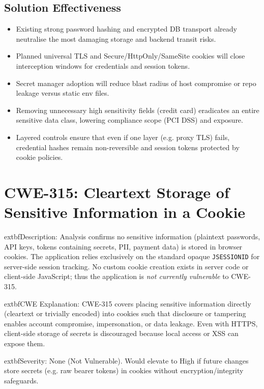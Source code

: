 \documentclass[]{UCD_CS_FYP_Report}
\begin{document}
\subsection*{Solution Effectiveness}
\begin{itemize}
	\item Existing strong password hashing and encrypted DB transport already neutralise the most damaging storage and backend transit risks.
	\item Planned universal TLS and Secure/HttpOnly/SameSite cookies will close interception windows for credentials and session tokens.
	\item Secret manager adoption will reduce blast radius of host compromise or repo leakage versus static env files.
	\item Removing unnecessary high sensitivity fields (credit card) eradicates an entire sensitive data class, lowering compliance scope (PCI DSS) and exposure.
	\item Layered controls ensure that even if one layer (e.g. proxy TLS) fails, credential hashes remain non-reversible and session tokens protected by cookie policies.
\end{itemize}

\section{CWE-315: Cleartext Storage of Sensitive Information in a Cookie}

	extbf{Description}: Analysis confirms no sensitive information (plaintext passwords, API keys, tokens containing secrets, PII, payment data) is stored in browser cookies. The application relies exclusively on the standard opaque \texttt{JSESSIONID} for server-side session tracking. No custom cookie creation exists in server code or client-side JavaScript; thus the application is \emph{not currently vulnerable} to CWE-315.

	extbf{CWE Explanation}: CWE-315 covers placing sensitive information directly (cleartext or trivially encoded) into cookies such that disclosure or tampering enables account compromise, impersonation, or data leakage. Even with HTTPS, client-side storage of secrets is discouraged because local access or XSS can expose them.

	extbf{Severity}: None (Not Vulnerable). Would elevate to High if future changes store secrets (e.g. raw bearer tokens) in cookies without encryption/integrity safeguards.
\end{document}
